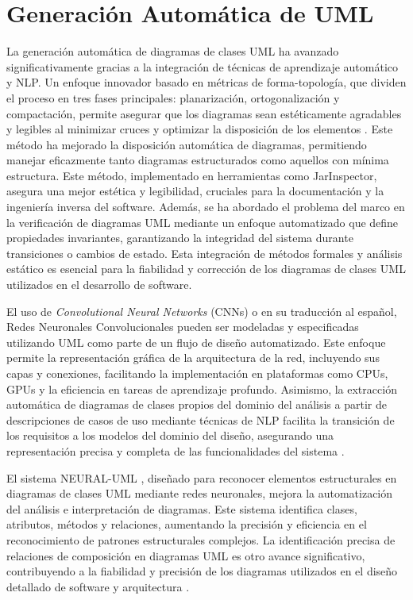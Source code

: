 

\section{Generación Automática de UML}

La generación automática de diagramas de clases UML ha avanzado significativamente gracias a la integración de técnicas de aprendizaje automático y NLP. Un enfoque innovador basado en métricas de forma-topología, que dividen el proceso en tres fases principales: planarización, ortogonalización y compactación, permite asegurar que los diagramas sean estéticamente agradables y legibles al minimizar cruces y optimizar la disposición de los elementos \cite{Eiglsperger2003}. Este método ha mejorado la disposición automática de diagramas, permitiendo manejar eficazmente tanto diagramas estructurados como aquellos con mínima estructura. Este método, implementado en herramientas como JarInspector, asegura una mejor estética y legibilidad, cruciales para la documentación y la ingeniería inversa del software. Además, se ha abordado el problema del marco en la verificación de diagramas UML mediante un enfoque automatizado que define propiedades invariantes, garantizando la integridad del sistema durante transiciones o cambios de estado. Esta integración de métodos formales y análisis estático es esencial para la fiabilidad y corrección de los diagramas de clases UML utilizados en el desarrollo de software.


El uso de \textit{Convolutional Neural Networks} (CNNs) o en su traducción al español, Redes Neuronales Convolucionales pueden ser modeladas y especificadas utilizando UML como parte de un flujo de diseño automatizado. Este enfoque \cite{Suarez2023} permite la representación gráfica de la arquitectura de la red, incluyendo sus capas y conexiones, facilitando la implementación en plataformas como CPUs, GPUs y la eficiencia en tareas de aprendizaje profundo. Asimismo, la extracción automática de diagramas de clases propios del dominio del análisis a partir de descripciones de casos de uso mediante técnicas de NLP facilita la transición de los requisitos a los modelos del dominio del diseño, asegurando una representación precisa y completa de las funcionalidades del sistema \cite{Gosala2021}.

El sistema NEURAL-UML \cite{Chu2020}, diseñado para reconocer elementos estructurales en diagramas de clases UML mediante redes neuronales, mejora la automatización del análisis e interpretación de diagramas. Este sistema identifica clases, atributos, métodos y relaciones, aumentando la precisión y eficiencia en el reconocimiento de patrones estructurales complejos. La identificación precisa de relaciones de composición en diagramas UML es otro avance significativo, contribuyendo a la fiabilidad y precisión de los diagramas utilizados en el diseño detallado de software y arquitectura \cite{Koenig2023}.

